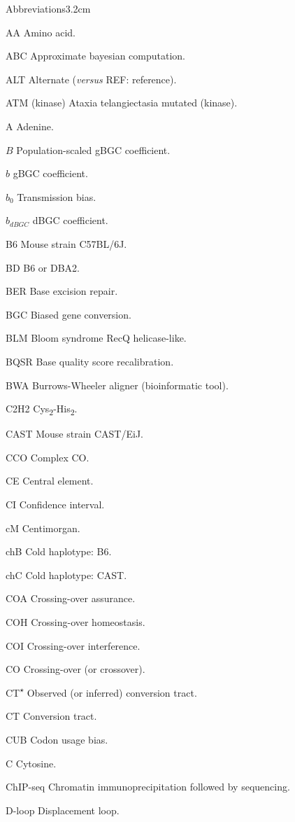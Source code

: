 \begin{mclistof}{Abbreviations}{3.2cm}
\item[AA] Amino acid.
\item[ABC] Approximate bayesian computation.
\item[ALT] Alternate (\textit{versus} REF\@: reference).
\item[ATM (kinase)] Ataxia telangiectasia mutated (kinase).
\item[A] Adenine.
\item[$B$] Population-scaled gBGC coefficient.
\item[$b$] gBGC coefficient.
\item[$b_0$] Transmission bias.
\item[$b_{dBGC}$] dBGC coefficient.
\item[B6] Mouse strain C57BL/6J\@.
\item[BD] B6 or DBA2.
\item[BER] Base excision repair.
\item[BGC] Biased gene conversion.
\item[BLM] Bloom syndrome RecQ helicase-like.
\item[BQSR] Base quality score recalibration.
\item[BWA] Burrows-Wheeler aligner (bioinformatic tool).
\item[C2H2] Cys\textsubscript{2}-His\textsubscript{2}.
\item[CAST] Mouse strain CAST/EiJ\@.
\item[CCO] Complex CO\@.
\item[CE] Central element.
\item[CI] Confidence interval.
\item[cM] Centimorgan.
\item[chB] Cold haplotype: B6.
\item[chC] Cold haplotype: CAST\@.
\item[COA] Crossing-over assurance.
\item[COH] Crossing-over homeostasis.
\item[COI] Crossing-over interference.
\item[CO] Crossing-over (or crossover).
\item[CT\textsuperscript{$\star$}] Observed (or inferred) conversion tract.
\item[CT] Conversion tract.
\item[CUB] Codon usage bias.
\item[C] Cytosine.
\item[ChIP-seq] Chromatin immunoprecipitation followed by sequencing.
\item[D-loop] Displacement loop.

\end{mclistof}

